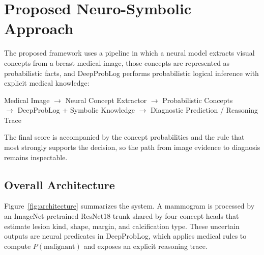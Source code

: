 \section{Proposed Neuro-Symbolic Approach}
\label{sec:methodology}

The proposed framework uses a pipeline in which a neural model extracts visual concepts from a breast medical image, those concepts are represented as probabilistic facts, and DeepProbLog performs probabilistic logical inference with explicit medical knowledge:

\begin{center}
\small
Medical Image $\rightarrow$ Neural Concept Extractor $\rightarrow$ Probabilistic Concepts \\
$\rightarrow$ DeepProbLog + Symbolic Knowledge $\rightarrow$ Diagnostic Prediction / Reasoning Trace
\end{center}

 The final score is accompanied by the concept probabilities and the rule that most strongly supports the decision, so the path from image evidence to diagnosis remains inspectable.

\subsection{Overall Architecture}
\label{sec:architecture}

Figure~\ref{fig:architecture} summarizes the system. A mammogram is processed by an ImageNet-pretrained ResNet18 trunk shared by four concept heads that estimate lesion kind, shape, margin, and calcification type. These uncertain outputs are neural predicates in DeepProbLog, which applies medical rules to compute $P(\mathrm{malignant})$ and exposes an explicit reasoning trace.

